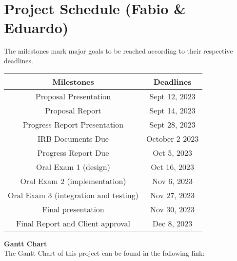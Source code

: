  \section{Project Schedule (Fabio \& Eduardo)}
 The milestones mark major goals to be reached according to their respective deadlines.
\begin{table}[H]
    \centering
    \begin{tabular}{||c | c||} 
        \hline
        Milestones & Deadlines\\
        \hline
        Proposal Presentation & Sept 12, 2023\\
        \hline
        Proposal Report & Sept 14, 2023\\
        \hline
        Progress Report Presentation & Sept 28, 2023\\
        \hline
        IRB Documents Due & October 2  2023\\
        \hline
        Progress Report Due & Oct 5, 2023\\
        \hline
        Oral Exam 1 (design) & Oct 16, 2023\\
        \hline
        Oral Exam 2 (implementation)& Nov 6, 2023\\
        \hline
        Oral Exam 3 (integration and testing) & Nov 27, 2023\\
        \hline
        Final presentation & Nov 30, 2023\\
        \hline
        Final Report and Client approval & Dec 8, 2023\\
        \hline
    \end{tabular}
\end{table}
\textbf{Gantt Chart}\\
The Gantt Chart of this project can be found in the following link: